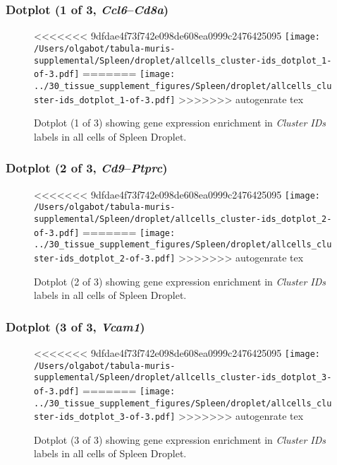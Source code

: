 \clearpage

\subsubsection{Dotplot (1 of 3, \emph{Ccl6}--\emph{Cd8a})}
\begin{figure}[h]
\centering
<<<<<<< 9dfdae4f73f742e098de608ea0999c2476425095
\texttt{[image: /Users/olgabot/tabula-muris-supplemental/Spleen/droplet/allcells\_cluster-ids\_dotplot\_1-of-3.pdf]}
=======
\texttt{[image: ../30\_tissue\_supplement\_figures/Spleen/droplet/allcells\_cluster-ids\_dotplot\_1-of-3.pdf]}
>>>>>>> autogenrate tex

\caption{ Dotplot (1 of 3)  showing gene expression enrichment in \emph{Cluster IDs} labels in all cells of Spleen Droplet. }
\end{figure}


\clearpage

\subsubsection{Dotplot (2 of 3, \emph{Cd9}--\emph{Ptprc})}
\begin{figure}[h]
\centering
<<<<<<< 9dfdae4f73f742e098de608ea0999c2476425095
\texttt{[image: /Users/olgabot/tabula-muris-supplemental/Spleen/droplet/allcells\_cluster-ids\_dotplot\_2-of-3.pdf]}
=======
\texttt{[image: ../30\_tissue\_supplement\_figures/Spleen/droplet/allcells\_cluster-ids\_dotplot\_2-of-3.pdf]}
>>>>>>> autogenrate tex

\caption{ Dotplot (2 of 3)  showing gene expression enrichment in \emph{Cluster IDs} labels in all cells of Spleen Droplet. }
\end{figure}


\clearpage

\subsubsection{Dotplot (3 of 3, \emph{Vcam1})}
\begin{figure}[h]
\centering
<<<<<<< 9dfdae4f73f742e098de608ea0999c2476425095
\texttt{[image: /Users/olgabot/tabula-muris-supplemental/Spleen/droplet/allcells\_cluster-ids\_dotplot\_3-of-3.pdf]}
=======
\texttt{[image: ../30\_tissue\_supplement\_figures/Spleen/droplet/allcells\_cluster-ids\_dotplot\_3-of-3.pdf]}
>>>>>>> autogenrate tex

\caption{ Dotplot (3 of 3)  showing gene expression enrichment in \emph{Cluster IDs} labels in all cells of Spleen Droplet. }
\end{figure}

